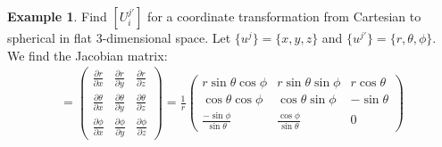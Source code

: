 \documentclass{article}
\theoremstyle{definition}
\newtheorem{exmp}{Example}[section]
\begin{document}
\begin{exmp}
	Find $[U^{j'}_i]$ for a coordinate transformation from Cartesian to spherical in flat 3-dimensional space. Let $\{u^j\} = \{ x,y,z\}$ and $\{u^{j'} \} = \{ r, \theta, \phi\} $. We find the Jacobian matrix:
	\begin{align*}
	[U^{j'}_i] = 
	\begin{pmatrix}
	\frac{\partial r}{\partial x} & \frac{\partial r}{\partial y} & \frac{\partial r}{\partial z}\\
	\frac{\partial \theta}{\partial x} & \frac{\partial \theta}{\partial y} & \frac{\partial \theta}{\partial z}\\
	\frac{\partial \phi}{\partial x} & \frac{\partial \phi}{\partial y} & \frac{\partial \phi}{\partial z}
	\end{pmatrix}
	=\frac{1}{r}
	\begin{pmatrix}
	r\sin\theta\cos\phi & r\sin\theta\sin\phi & r\cos\theta\\
	\cos\theta\cos\phi & \cos\theta\sin\phi & -\sin\theta\\
	\frac{-\sin\phi}{\sin\theta} & \frac{\cos\phi}{\sin\theta} & 0
	\end{pmatrix}
	\end{align*}
\end{exmp}
\end{document}
